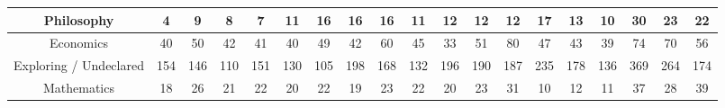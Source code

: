 \documentclass[10]{article}
\begin{document}
\begin{landscape}
\begin{longtable}[c]{|ccccccccccccccccccc|}
	\multicolumn{1}{|c|}{Philosophy}                                 & \multicolumn{1}{c|}{4}          & \multicolumn{1}{c|}{9}          & \multicolumn{1}{c|}{8}          & \multicolumn{1}{c|}{7}          & \multicolumn{1}{c|}{11}         & \multicolumn{1}{c|}{16}         & \multicolumn{1}{c|}{16}         & \multicolumn{1}{c|}{16}         & \multicolumn{1}{c|}{11}         & \multicolumn{1}{c|}{12}         & \multicolumn{1}{c|}{12}         & \multicolumn{1}{c|}{12}         & \multicolumn{1}{c|}{17}         & \multicolumn{1}{c|}{13}         & \multicolumn{1}{c|}{10}         & \multicolumn{1}{c|}{30}         & \multicolumn{1}{c|}{23}         & 22         \\ \hline
	\multicolumn{1}{|c|}{Economics}                                  & \multicolumn{1}{c|}{40}         & \multicolumn{1}{c|}{50}         & \multicolumn{1}{c|}{42}         & \multicolumn{1}{c|}{41}         & \multicolumn{1}{c|}{40}         & \multicolumn{1}{c|}{49}         & \multicolumn{1}{c|}{42}         & \multicolumn{1}{c|}{60}         & \multicolumn{1}{c|}{45}         & \multicolumn{1}{c|}{33}         & \multicolumn{1}{c|}{51}         & \multicolumn{1}{c|}{80}         & \multicolumn{1}{c|}{47}         & \multicolumn{1}{c|}{43}         & \multicolumn{1}{c|}{39}         & \multicolumn{1}{c|}{74}         & \multicolumn{1}{c|}{70}         & 56         \\ \hline
	\multicolumn{1}{|c|}{Exploring / Undeclared}                     & \multicolumn{1}{c|}{154}        & \multicolumn{1}{c|}{146}        & \multicolumn{1}{c|}{110}        & \multicolumn{1}{c|}{151}        & \multicolumn{1}{c|}{130}        & \multicolumn{1}{c|}{105}        & \multicolumn{1}{c|}{198}        & \multicolumn{1}{c|}{168}        & \multicolumn{1}{c|}{132}        & \multicolumn{1}{c|}{196}        & \multicolumn{1}{c|}{190}        & \multicolumn{1}{c|}{187}        & \multicolumn{1}{c|}{235}        & \multicolumn{1}{c|}{178}        & \multicolumn{1}{c|}{136}        & \multicolumn{1}{c|}{369}        & \multicolumn{1}{c|}{264}        & 174        \\ \hline
	\multicolumn{1}{|c|}{Mathematics}                                & \multicolumn{1}{c|}{18}         & \multicolumn{1}{c|}{26}         & \multicolumn{1}{c|}{21}         & \multicolumn{1}{c|}{22}         & \multicolumn{1}{c|}{20}         & \multicolumn{1}{c|}{22}         & \multicolumn{1}{c|}{19}         & \multicolumn{1}{c|}{23}         & \multicolumn{1}{c|}{22}         & \multicolumn{1}{c|}{20}         & \multicolumn{1}{c|}{23}         & \multicolumn{1}{c|}{31}         & \multicolumn{1}{c|}{10}         & \multicolumn{1}{c|}{12}         & \multicolumn{1}{c|}{11}         & \multicolumn{1}{c|}{37}         & \multicolumn{1}{c|}{28}         & 39         \\ \hline

\end{longtable}
\end{landscape}
\end{document}
